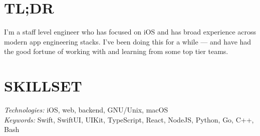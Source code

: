 \documentclass[line,margin]{res}
\begin{document}
\address{adam@zethrae.us}
\address{+1 (404) 666-9384}

 
\begin{resume}

\section{TL;DR}
    I'm a staff level engineer who has focused on iOS and has broad experience across
    modern app engineering stacks. I've been doing this for a while — and have had the good
    fortune of working with and learning from some top tier teams.

\section{SKILLSET}
    {\sl Technologies:} iOS, web, backend, GNU/Unix, macOS\\
    {\sl Keywords:} Swift, SwiftUI, UIKit, TypeScript, React, NodeJS, Python, Go, C++, Bash


\end{resume}
\end{document}
